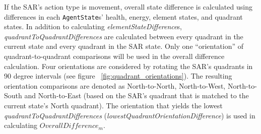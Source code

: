 
If the SAR's action type is movement, overall state difference is calculated using differences in each \texttt{AgentState}s' health, energy, element states, and quadrant states.
In addition to calculating \textit{elementStateDifference}s, \textit{quadrantToQuadrantDifferences} are calculated between every quadrant in the current state and every quadrant in the SAR state.
Only one ``orientation'' of quadrant-to-quadrant comparisons will be used in the overall difference calculation.
Four orientations are considered by rotating the SAR's quadrants in 90 degree intervals (see figure ~\ref{fig:quadrant_orientations}).
The resulting orientation comparisons are denoted as North-to-North, North-to-West, North-to-South and North-to-East (based on the SAR's quadrant that is matched to the current state's North quadrant).
The orientation that yields the lowest \textit{quadrantToQuadrantDifferences} (\textit{lowestQuadrantOrientationDifference}) is used in calculating $OverallDifference_{m}$.


